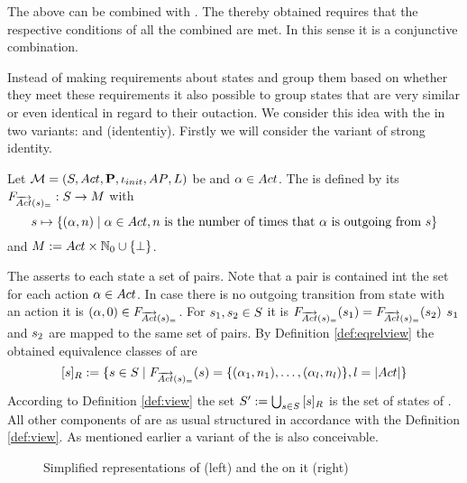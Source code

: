 \documentclass[preview]{standalone}
\begin{document}
The \viewsN above can be combined with \parllcompN. The thereby obtained \viewN requires that the respective conditions of all the combined \viewsN are met. In this sense it is a conjunctive combination.

Instead of making requirements about states and group them based on whether they meet these requirements it also possible to group states that are very similar or even identical in regard to their outaction. We consider this idea with the \emph{\outactident \viewNC} in two variants: \outactidentstrong and \outactidentweak (idententiy). Firstly we will consider the variant of strong identity.

\begin{definition}
	Let ${{{\mathcal{M}}}} = {{({S}, {Act}, {\textbf{P}}, {\iota_{init}}, {AP}, {L})}}$ be \achgphN and ${\alpha} \in {Act}$. The \viewN \viewstrongoutactident is defined by its \grpfctN ${{F_{{\overrightarrow{{Act}}}({s})_=}}} : {S} \to {\ensuremath{{M}}}$ with
	\[
	\state \mapsto	
	\{(\action, \numoutact) \mid \action \in \actions, \numoutact \text{ is the number of times that \action is outgoing from } \state\}
	\]
	and ${{M}} := {Act} \times {\mathbb{N}}_0 \cup {\{\bot\}}$.
\end{definition}

The \grpfctN asserts to each state a set of pairs. Note that a pair is contained int the set for each action ${\alpha} \in {Act}$. In case there is no outgoing transition from state \state with an action \action it is $({\alpha}, 0) \in {\ensuremath{{F_{{\overrightarrow{{Act}}}({s})_=}}}}$. For ${s}_1, {s}_2 \in {S}$ it is ${{F_{{\overrightarrow{{Act}}}({s})_=}}}({s}_1) = {{F_{{\overrightarrow{{Act}}}({s})_=}}}({s}_2)$ \iffN ${s}_1$ and ${s}_2$ are mapped to the same set of pairs. By Definition \ref{def:eqrelview} the obtained equivalence classes of \eqrelview are
\[
	{{[{s}]_{{R}}}} := \{{s} \in {S} \mid {\ensuremath{{F_{{\overrightarrow{{Act}}}({s})_=}}}}({s}) = \{({\alpha}_1, {n}_1), \dots, ({\alpha}_l, {n}_l)\}, l = |{Act}|\}
\]
According to Definition \ref{def:view} the set ${S}' := \bigcup_{{s} \in {S}} {{[{s}]_{{R}}}}$ is the set of states of \viewstrongoutactident. All other components of \viewstrongoutactident are as usual structured in accordance with the Definition \ref{def:view}.
As mentioned earlier a \outactidentweak variant of the \outactident \viewN is also conceivable.

\begin{figure}[h]
	\begin{minipage}{.5\textwidth}
		\hspace{5mm}
		
	\end{minipage}%
	\begin{minipage}{.5\textwidth}		
		\hspace{5mm}
		
	\end{minipage}
	
	\caption{Simplified representations of \mdp (left) and the \viewN \viewstrongoutactident on it (right)}
	\label{fig:outActIdentStrongAfter}

\end{figure}
\end{document}
